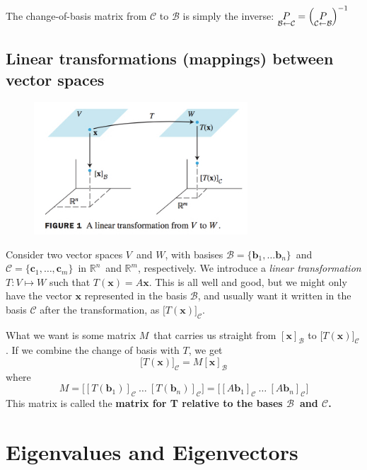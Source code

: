 \documentclass[12p,a4paper]{report}
\renewcommand{\b}{\boldsymbol}
\newcommand{\m}{\mathbb}
\begin{document}
The change-of-basis matrix from $\mathcal{C}$ to $\mathcal{B}$ is simply the inverse: $\underset{\mathcal{B}\leftarrow\mathcal{C}}{P} = \qty(\underset{\mathcal{C}\leftarrow\mathcal{B}}{P})^{-1}$



\section{Linear transformations (mappings) between vector spaces}

\begin{figure}
    \includegraphics[width=8cm]{figs/map.jpg}
\end{figure} 
Consider two vector spaces $V$ and $W$, with basises $\mathcal{B} = \{\b b_1,\dots \b b_n\}$ and $\mathcal{C} = \{\b c_1,\dots, \b c_m\}$ in $\m R^n$ and $\m R^m$, respectively. We introduce a \textit{linear transformation} $T: V \mapsto W$ such that $T(\b x) = A\b x$. This is all well and good, but we might only have the vector $\b x$ represented in the basis $\mathcal{B}$, and usually want it written in the basis $\mathcal{C}$ after the transformation, as $\big[T(\b x)\big]_\mathcal{C}$.

What we want is some matrix $M$ that carries us straight from $[\b x]_\mathcal{B}$ to $\big[T(\b x)\big]_\mathcal{C}$. If we combine the change of basis with $T$, we get
\[
    \big[T(\b x)\big]_\mathcal{C} = M[\b x]_\mathcal{B}
\]
where
\[
    M = \Big[[T(\b b_1)]_\mathcal{C}\ \dots \ [T(\b b_n)]_\mathcal{C} \Big]
      = \Big[[A\b b_1]_\mathcal{C}\ \dots \ [A\b b_n]_\mathcal{C} \Big]
\]
This matrix is called the \textbf{matrix for T relative to the bases $\mathcal{B}$ and $\mathcal{C}$.}






\chapter{Eigenvalues and Eigenvectors}
\end{document}
